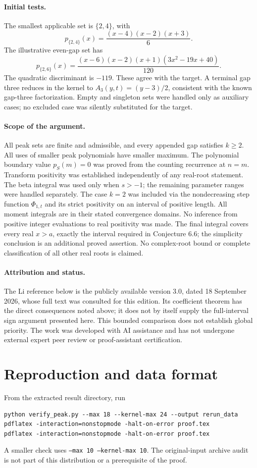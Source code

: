 \documentclass[11pt]{article}
\theoremstyle{definition}
\begin{document}
\paragraph{Initial tests.}
The smallest applicable set is $\{2,4\}$, with
\[
 p_{\{2,4\}}(x)=\frac{(x-4)(x-2)(x+3)}6.
\]
The illustrative even-gap set has
\[
 p_{\{2,6\}}(x)=\frac{(x-6)(x-2)(x+1)(3x^2-19x+40)}{120}.
\]
The quadratic discriminant is $-119$. These agree with the target. A terminal gap three reduces in the kernel to $A_3(y,t)=(y-3)/2$, consistent with the known gap-three factorization. Empty and singleton sets were handled only as auxiliary cases; no excluded case was silently substituted for the target.

\paragraph{Scope of the argument.}
All peak sets are finite and admissible, and every appended gap satisfies $k\ge2$. All uses of smaller peak polynomials have smaller maximum. The polynomial boundary value $p_S(m)=0$ was proved from the counting recurrence at $n=m$. Transform positivity was established independently of any real-root statement. The beta integral was used only when $s>-1$; the remaining parameter ranges were handled separately. The case $k=2$ was included via the nondecreasing step function $\Phi_{1,t}$ and its strict positivity on an interval of positive length. All moment integrals are in their stated convergence domains. No inference from positive integer evaluations to real positivity was made. The final integral covers every real $x>a$, exactly the interval required in Conjecture 6.6; the simplicity conclusion is an additional proved assertion. No complex-root bound or complete classification of all other real roots is claimed.

\paragraph{Attribution and status.}
The Li reference below is the publicly available version 3.0, dated
18 September 2026, whose full text was consulted for this edition.
Its coefficient theorem has the direct consequences noted above; it does not
by itself supply the full-interval sign argument presented here. This bounded
comparison does not establish global priority. The work was developed with
AI assistance and has not undergone external expert peer review or
proof-assistant certification.

\section{Reproduction and data format}
From the extracted result directory, run
\begin{verbatim}
python verify_peak.py --max 18 --kernel-max 24 --output rerun_data
pdflatex -interaction=nonstopmode -halt-on-error proof.tex
pdflatex -interaction=nonstopmode -halt-on-error proof.tex
\end{verbatim}
A smaller check uses \texttt{--max 10 --kernel-max 10}. The original-input archive audit is not part of this distribution or a prerequisite of the proof.
\end{document}
